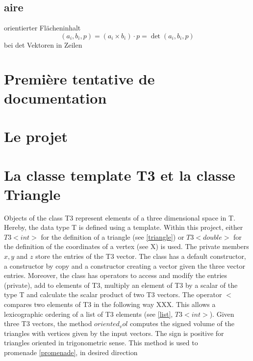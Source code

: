 \documentclass[10pt]{article}
\begin{document}
\subsection{aire}

orientierter Flächeninhalt
$$ (a_i,b_i,p) = (a_i \times b_i ) \cdot p = \det(a_i,b_i,p) $$
bei det Vektoren in Zeilen


\newpage

\section{Première tentative de documentation}

\section{Le projet}

\section{La classe template T3 et la classe Triangle}

Objects of the class T3 represent elements of a three dimensional space in T. Hereby, the data type T is defined using a template. Within this project, either $T3<int>$ for the definition of a triangle (see \ref{triangle}) or $T3<double>$ for the definition of the coordinates of a vertex (see X) is used. The private members $x,y$ and $z$ store the entries of the T3 vector. The class has a default constructor, a constructor by copy and a constructor creating a vector given the three vector entries. Moreover, the class has operators to access and modify the entries (private), add to elements of T3, multiply an element of T3 by a scalar of the type T and calculate the scalar product of two T3 vectors. The operator $<$ compares two elements of T3 in the following way XXX. This allows a lexicographic ordering of a list of T3 elements (see \ref{list}, $T3<int>$). Given three T3 vectors, the method $ oriented_vol $ computes the signed volume of the triangles with vertices given by the input vectors. The sign is positive for triangles oriented in trigonometric sense. This method is used to \\
promenade \ref{promenade}, in desired direction \\
\end{document}
